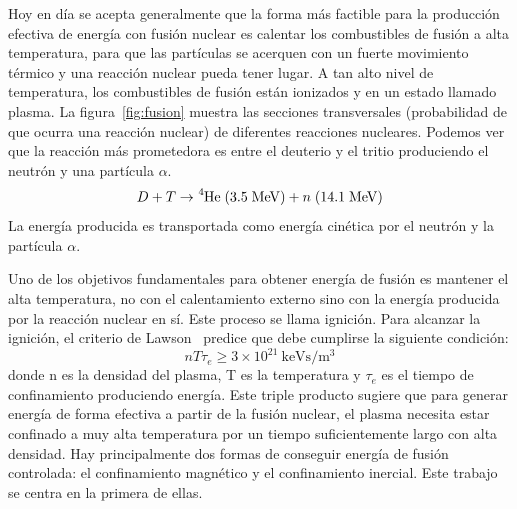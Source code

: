 Hoy en día se acepta generalmente que la forma más factible para la producción efectiva de energía 
con fusión nuclear es calentar los combustibles de fusión a alta temperatura, para que las partículas se acerquen
con un fuerte movimiento térmico y una reacción nuclear pueda tener lugar. A tan alto nivel de
temperatura, los combustibles de fusión están ionizados y en un estado llamado plasma. La figura~\ref{fig:fusion} muestra las
secciones transversales (probabilidad de que ocurra una reacción nuclear) de diferentes reacciones nucleares.
Podemos ver que la reacción más prometedora es entre el deuterio y el tritio produciendo el neutrón
y una partícula $\alpha$.
\begin{equation}\label{eq:deutreaction}
    D+T\rightarrow\ce{^{4}He}\;(3.5\;\mathrm{MeV})+n\;(14.1\;\mathrm{MeV})
\end{equation}
La energía producida es transportada como energía cinética por el neutrón y la partícula $\alpha$.\par
Uno de los objetivos fundamentales para obtener energía de fusión es mantener el alta temperatura, no con el calentamiento 
externo sino con la energía producida por la reacción nuclear en sí. Este
proceso se llama ignición. Para alcanzar la ignición, el criterio de Lawson~\cite{Lawson_1957} predice que 
debe cumplirse la siguiente condición:
\begin{equation}\label{eq:lawson}
    nT\tau_e\geq3\times10^{21}\:\mathrm{keVs/m^{3}}
\end{equation}
donde n es la densidad del plasma, T es la temperatura y $\tau_e$ es el tiempo de confinamiento produciendo energía.
Este triple producto sugiere que para generar energía de forma efectiva a partir de la fusión nuclear, el plasma
necesita estar confinado a muy alta temperatura por un tiempo suficientemente largo con alta densidad.
Hay principalmente dos formas de conseguir energía de fusión controlada: el confinamiento magnético 
y el confinamiento inercial. Este trabajo se centra en la primera de ellas.\par
